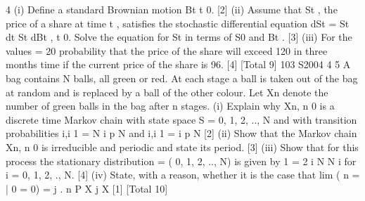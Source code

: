 
4 (i) Define a standard Brownian motion {Bt t 0}. [2]
(ii) Assume that St , the price of a share at time t , satisfies the stochastic
differential equation
dSt = St dt St dBt , t 0.
Solve the equation for St in terms of S0 and Bt . [3]
(iii) For the values = 20%
probability that the price of the share will exceed 120 in three months time if
the current price of the share is 96. [4]
[Total 9]
103 S2004 4
5 A bag contains N balls, all green or red. At each stage a ball is taken out of the bag at
random and is replaced by a ball of the other colour. Let Xn denote the number of
green balls in the bag after n stages.
(i) Explain why Xn, n 0 is a discrete time Markov chain with state space
S = {0, 1, 2, .., N} and with transition probabilities
i,i 1 =
N i
p
N
and i,i 1 =
i
p
N
[2]
(ii) Show that the Markov chain Xn, n 0 is irreducible and periodic and state its
period. [3]
(iii) Show that for this process the stationary distribution = ( 0, 1, 2, .., N)
is given by
1
=
2 i N
N
i
for i = 0, 1, 2, ., N. [4]
(iv) State, with a reason, whether it is the case that
lim ( n = | 0 = 0) = j .
n
P X j X [1]
[Total 10]


